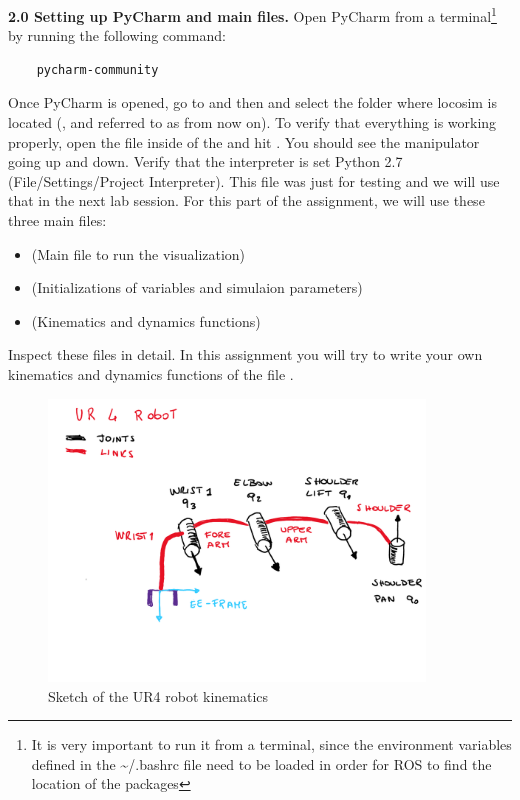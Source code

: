 \documentclass[11pt]{article}
\begin{document}
\textbf{2.0 Setting up PyCharm and main files.} Open PyCharm from a terminal\footnote{It is very important to run it from a terminal, since the environment variables defined in the \textasciitilde/.bashrc file need to be loaded in order for ROS to find the location of the packages} by running the following command:
%
\begin{verbatim}
	pycharm-community
\end{verbatim}
%
Once PyCharm is opened, go to  and then  and select the folder where locosim is located (, and referred to as  from now on). To verify that everything is working properly, open the file   inside of the  and hit . You should see the manipulator going up and down. 
Verify that the interpreter is set Python 2.7 (File/Settings/Project Interpreter).
This file was just for testing and we will use that in  the next lab session.
%
%
For this part of the assignment, we will use these three main files: 
\begin{itemize}
	\item {} (Main file to run the visualization)
	\item {} (Initializations of variables and simulaion parameters)
	\item {} (Kinematics and dynamics functions)
\end{itemize}
Inspect these files in detail. In this assignment you will try to write your own kinematics and dynamics functions of the file .\\


\begin{figure}[bht]
	\centering
	\includegraphics[width=10cm]{pics/ur4_Robot.pdf}
	\caption{Sketch of the UR4 robot kinematics}
	\label{fig:ur4_robot_kinematics}
\end{figure} 
\end{document}
